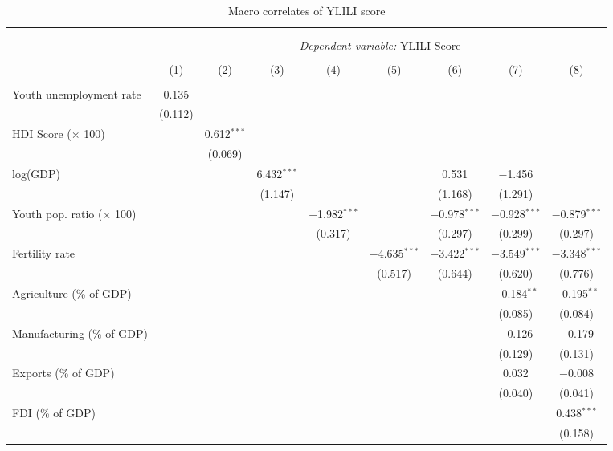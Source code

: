 \begin{table}[ht] 
\footnotesize
\centering
\caption{Macro correlates of YLILI score} \label{tab:macrocorr}
 \begin{threeparttable}
 \begin{tabular}{@{\extracolsep{-10pt}}lcccccccc} 
\\[-1.8ex]\hline 
\hline \\[-1.8ex] 
\\[-1.8ex] & \multicolumn{8}{c}{\textit{Dependent variable:} YLILI Score} \\ 
\cline{2-9} 
\\[-1.8ex] & (1) & (2) & (3) & (4) & (5) & (6) & (7) & (8)\\ 
\hline \\[-1.8ex] 
 Youth unemployment rate & 0.135 &  &  &  &  &  &  &  \\ 
  & (0.112) &  &  &  &  &  &  &  \\ 
  HDI Score ($\times$ 100) &  & 0.612$^{***}$ &  &  &  &  &  &  \\ 
  &  & (0.069) &  &  &  &  &  &  \\ 
  log(GDP) &  &  & 6.432$^{***}$ &  &  & 0.531 & $-$1.456 &  \\ 
  &  &  & (1.147) &  &  & (1.168) & (1.291) &  \\ 
  Youth pop. ratio ($\times$ 100) &  &  &  & $-$1.982$^{***}$ &  & $-$0.978$^{***}$ & $-$0.928$^{***}$ & $-$0.879$^{***}$ \\ 
  &  &  &  & (0.317) &  & (0.297) & (0.299) & (0.297) \\ 
  Fertility rate &  &  &  &  & $-$4.635$^{***}$ & $-$3.422$^{***}$ & $-$3.549$^{***}$ & $-$3.348$^{***}$ \\ 
  &  &  &  &  & (0.517) & (0.644) & (0.620) & (0.776) \\ 
  Agriculture (\% of GDP) &  &  &  &  &  &  & $-$0.184$^{**}$ & $-$0.195$^{**}$ \\ 
  &  &  &  &  &  &  & (0.085) & (0.084) \\ 
  Manufacturing (\% of GDP) &  &  &  &  &  &  & $-$0.126 & $-$0.179 \\ 
  &  &  &  &  &  &  & (0.129) & (0.131) \\ 
  Exports (\% of GDP) &  &  &  &  &  &  & 0.032 & $-$0.008 \\ 
  &  &  &  &  &  &  & (0.040) & (0.041) \\ 
  FDI (\% of GDP) &  &  &  &  &  &  &  & 0.438$^{***}$ \\ 
  &  &  &  &  &  &  &  & (0.158) \\ 

\end{tabular}
\end{threeparttable}
\end{table}
